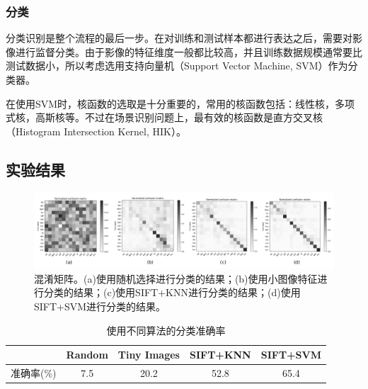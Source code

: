 \documentclass{article}
\begin{document}
\subsubsection{分类}
分类识别是整个流程的最后一步。在对训练和测试样本都进行表达之后，需要对影像进行监督分类。由于影像的特征维度一般都比较高，并且训练数据规模通常要比测试数据小，所以考虑选用支持向量机（Support Vector Machine, SVM）作为分类器。 

在使用SVM时，核函数的选取是十分重要的，常用的核函数包括：线性核，多项式核，高斯核等。不过在场景识别问题上，最有效的核函数是直方交叉核（Histogram Intersection Kernel, HIK）。

\subsection{实验结果}
\begin{figure}[h]
    \centering
    \includegraphics[width=\textwidth]{./project3/result.png}
    \caption{混淆矩阵。(a)使用随机选择进行分类的结果；(b)使用小图像特征进行分类的结果；(c)使用SIFT+KNN进行分类的结果；(d)使用SIFT+SVM进行分类的结果。}
\end{figure}

\begin{table}[ht]
    \centering
    \begin{tabular}{ccccc}
        \toprule
        & Random & Tiny Images & SIFT+KNN & SIFT+SVM\\
        \midrule
        准确率(\%) & 7.5 & 20.2 & 52.8 & 65.4 \\
        \bottomrule
    \end{tabular}
    \caption{使用不同算法的分类准确率}
\end{table}
\end{document}
